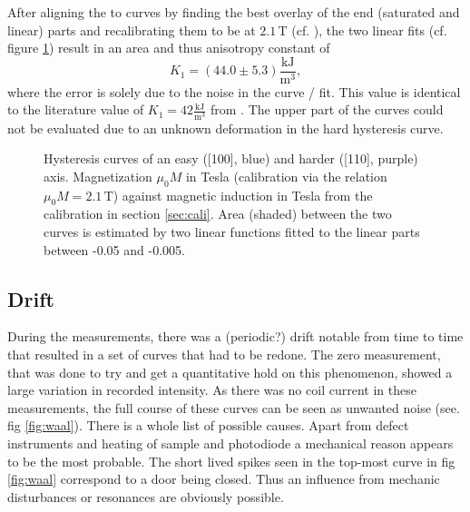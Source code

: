 \documentclass[a4paper]{scrartcl}
\numberwithin{equation}{section}
\numberwithin{figure}{section}
\numberwithin{table}{section}
\newcommand{\eq}[2]{\begin{equation}#1\label{#2}\end{equation}}
\begin{document}
After aligning the to curves by finding the best overlay of the end (saturated and linear) parts and recalibrating them to be at $2.1\,$T (cf. \cite{skript}), the two linear fits (cf. figure \ref{fig:ani}) result in an area and thus anisotropy constant of
\eq{K_1 = (44.0\pm 5.3)\frac{\text{kJ}}{\text{m}^3},}{} 
where the error is solely due to the noise in the curve / fit. This value is identical to the literature value of $K_1=42\frac{\text{kJ}}{\text{m}^3}$ from \cite{kittel}. The upper part of the curves could not be evaluated due to an unknown deformation in the hard hysteresis curve.
 
\begin{figure} 
 \centering
{}

\caption{
\small Hysteresis curves of an easy ([100], blue) and harder ([110], purple) axis. Magnetization $\mu_0 M$ in Tesla (calibration via the relation $\mu_0 M = 2.1\,\text{T}$) against magnetic induction in Tesla from the calibration in section \ref{sec:cali}. Area (shaded) between the two curves is estimated by two linear functions fitted to the linear parts between -0.05 and -0.005. } 
	\label{fig:ani}
\end{figure}


\subsection{Drift}
During the measurements, there was a (periodic?) drift notable from time to time that resulted in a set of curves that had to be redone. The zero measurement, that was done to try and get a quantitative hold on this phenomenon, showed a large variation in recorded intensity. As there was no coil current in these measurements, the full course of these curves can be seen as unwanted noise (see. fig \ref{fig:waal}). There is a whole list of possible causes. Apart from defect instruments and heating of sample and photodiode a mechanical reason appears to be the most probable. The short lived spikes seen in the top-most curve in fig \ref{fig:waal} correspond to a door being closed. Thus an influence from mechanic disturbances or resonances are obviously possible.
\end{document}
